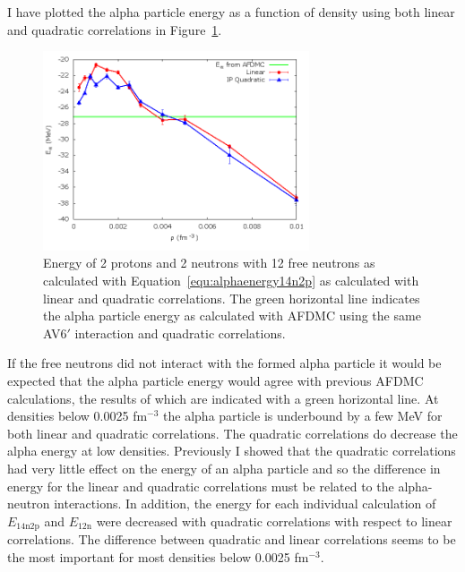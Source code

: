I have plotted the alpha particle energy as a function of density using both linear and quadratic correlations in Figure~\ref{fig:alpha}.
\begin{figure}[h!]
   \centering
   \includegraphics[width=0.7\textwidth]{figures/alpha.png}
   \caption[Energy of 2 Protons and 2 Neutrons with 12 Free Neutrons as Calculated with Equation~\ref{equ:alphaenergy14n2p} as Calculated with Linear and Quadratic Correlations. The Green Horizontal Line Indicates the Alpha Particle Energy as Calculated with AFDMC Using the Same AV6$'$ Interaction and Quadratic Correlations.]{Energy of 2 protons and 2 neutrons with 12 free neutrons as calculated with Equation~\ref{equ:alphaenergy14n2p} as calculated with linear and quadratic correlations. The green horizontal line indicates the alpha particle energy as calculated with AFDMC using the same AV6$'$ interaction and quadratic correlations.}
   \label{fig:alpha}
\end{figure}
If the free neutrons did not interact with the formed alpha particle it would be expected that the alpha particle energy would agree with previous AFDMC calculations, the results of which are indicated with a green horizontal line. At densities below 0.0025 fm$^{-3}$ the alpha particle is underbound by a few MeV for both linear and quadratic correlations. The quadratic correlations do decrease the alpha energy at low densities. Previously I showed that the quadratic correlations had very little effect on the energy of an alpha particle and so the difference in energy for the linear and quadratic correlations must be related to the alpha-neutron interactions. In addition, the energy for each individual calculation of $E_\text{14n2p}$ and $E_\text{12n}$ were decreased with quadratic correlations with respect to linear correlations. The difference between quadratic and linear correlations seems to be the most important for most densities below 0.0025 fm$^{-3}$.

